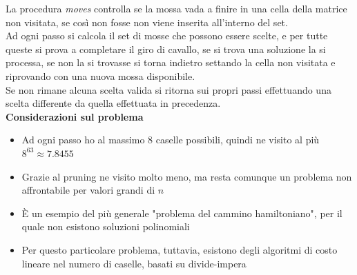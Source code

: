 \documentclass[../cheatSheetAlgoritmi.tex]{subfiles}
\begin{document}
La procedura \emph{moves} controlla se la mossa vada a finire in una cella della matrice non visitata, se così non fosse non viene inserita all'interno del set. \\
Ad ogni passo si calcola il set di mosse che possono essere scelte, e per tutte queste si prova a completare il giro di cavallo, se si trova una soluzione la si processa, se non la si trovasse si torna indietro settando la cella non visitata e riprovando con una nuova mossa disponibile. \\
Se non rimane alcuna scelta valida si ritorna sui propri passi effettuando una scelta differente da quella effettuata in precedenza. \\
\textbf{Considerazioni sul problema}
\begin{itemize}
	\item Ad ogni passo ho al massimo $8$ caselle possibili, quindi ne visito al più $8^63 \approx 7.8455$
	\item Grazie al pruning ne visito molto meno, ma resta comunque un problema non affrontabile per valori grandi di $n$
	\item È un esempio del più generale "problema del cammino hamiltoniano", per il quale non esistono soluzioni polinomiali
	\item Per questo particolare problema, tuttavia, esistono degli algoritmi di costo lineare nel numero di caselle, basati su divide-impera
\end{itemize}
\end{document}

